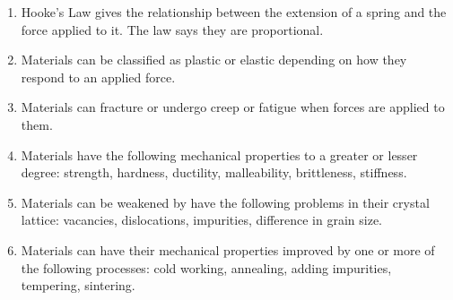 
\begin{enumerate}
\item Hooke's Law gives the relationship between the extension of a spring and the force applied to it. The law says they are proportional.
\item Materials can be classified as plastic or elastic depending on how they respond to an applied force. 
\item Materials can fracture or undergo creep or fatigue when forces are applied to them.
\item Materials have the following mechanical properties to a greater or lesser degree: strength, hardness, ductility, malleability, brittleness, stiffness.
\item Materials can be weakened by have the following problems in their crystal lattice: vacancies, dislocations, impurities, difference in grain size.
\item Materials can have their mechanical properties improved by one or more of the following processes: cold working, annealing, adding impurities, tempering, sintering.

\end{enumerate}

